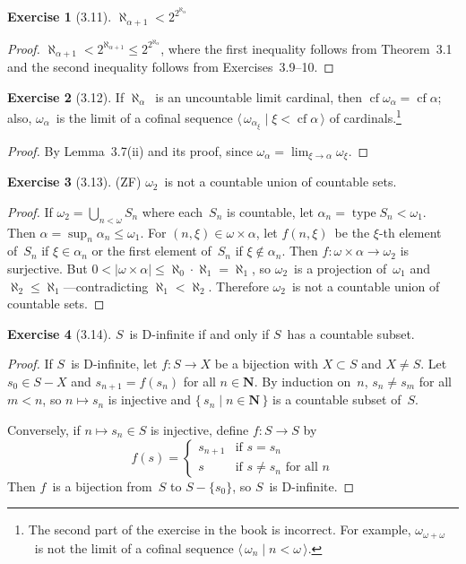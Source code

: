 \documentclass[letterpaper,12pt]{article}
\newcommand{\N}{\boldsymbol{N}}
\newcommand{\bigunion}{\bigcup}
\newcommand{\mult}{\cdot}
\DeclareMathOperator{\type}{type}
\DeclareMathOperator{\cf}{cf}
\newcommand{\card}[1]{|#1|}
\newcommand{\seq}[1]{\langle#1\rangle}
\theoremstyle{definition}
\newtheorem*{exer}{Exercise}
\theoremstyle{remark}
\begin{document}
\begin{exer}[3.11]
\(\aleph_{\alpha+1}<2^{2^{\aleph_{\alpha}}}\)
\end{exer}
\begin{proof}
\(\aleph_{\alpha+1}<2^{\aleph_{\alpha+1}}\le 2^{2^{\aleph_{\alpha}}}\), where the first inequality follows from Theorem~3.1 and the second inequality follows from Exercises~3.9--10.
\end{proof}

\begin{exer}[3.12]
If \(\aleph_{\alpha}\)~is an uncountable limit cardinal, then \(\cf\omega_{\alpha}=\cf\alpha\); also, \(\omega_{\alpha}\)~is the limit of a cofinal sequence \(\seq{\,\omega_{\alpha_{\xi}}\mid\xi<\cf\alpha\,}\) of cardinals.\footnote{The second part of the exercise in the book is incorrect. For example, \(\omega_{\omega+\omega}\)~is not the limit of a cofinal sequence \(\seq{\,\omega_n\mid n<\omega\,}\).}
\end{exer}
\begin{proof}
By Lemma~3.7(ii) and its proof, since \(\omega_{\alpha}=\lim_{\xi\to\alpha}\omega_{\xi}\).
\end{proof}

\begin{exer}[3.13]
(ZF) \(\omega_2\)~is not a countable union of countable sets.
\end{exer}
\begin{proof}
If \(\omega_2=\bigunion_{n<\omega} S_n\) where each~\(S_n\) is countable, let \(\alpha_n=\type S_n<\omega_1\). Then \(\alpha=\sup_n\alpha_n\le\omega_1\). For \((n,\xi)\in\omega\times\alpha\), let \(f(n,\xi)\)~be the \(\xi\)-th element of~\(S_n\) if \(\xi\in\alpha_n\) or the first element of~\(S_n\) if \(\xi\not\in\alpha_n\). Then \(f:\omega\times\alpha\to\omega_2\) is surjective. But \(0<\card{\omega\times\alpha}\le\aleph_0\mult\aleph_1=\aleph_1\), so \(\omega_2\)~is a projection of~\(\omega_1\) and \(\aleph_2\le\aleph_1\)---contradicting \(\aleph_1<\aleph_2\). Therefore \(\omega_2\)~is not a countable union of countable sets.
\end{proof}

\begin{exer}[3.14]
\(S\)~is D-infinite if and only if \(S\)~has a countable subset.
\end{exer}
\begin{proof}
If \(S\)~is D-infinite, let \(f:S\to X\) be a bijection with \(X\subset S\) and \(X\ne S\). Let \(s_0\in S-X\) and \(s_{n+1}=f(s_n)\) for all \(n\in\N\). By induction on~\(n\), \(s_n\ne s_m\) for all \(m<n\), so \(n\mapsto s_n\) is injective and \(\{\,s_n\mid n\in\N\,\}\) is a countable subset of~\(S\).

Conversely, if \(n\mapsto s_n\in S\) is injective, define \(f:S\to S\) by
\[f(s)=\begin{cases}
s_{n+1}&\text{if }s=s_n\\
s&\text{if }s\ne s_n\text{ for all }n
\end{cases}\]
Then \(f\)~is a bijection from~\(S\) to \(S-\{s_0\}\), so \(S\)~is D-infinite.
\end{proof}
\end{document}
